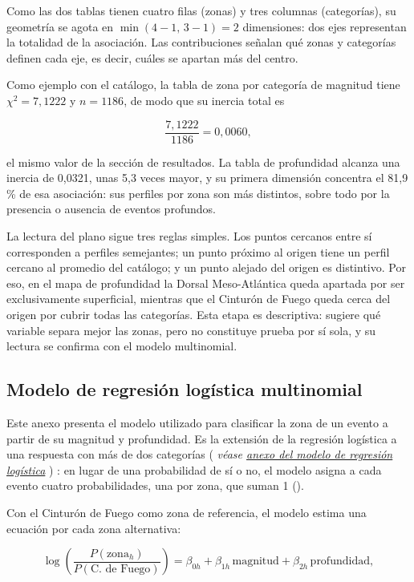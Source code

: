 \documentclass[
  spanish,
  letterpaper,
  DIV=11,
  numbers=noendperiod]{scrartcl}
\newcommand{\asesoriaParenRef}[1]{%
  \textnormal{\textcolor{asesoriaTextColor}{(}}%
  {\hypersetup{linkcolor=asesoriaLinkColor,urlcolor=asesoriaLinkColor,citecolor=asesoriaLinkColor}\textcolor{asesoriaTextColor}{\emph{#1}}}%
  \textnormal{\textcolor{asesoriaTextColor}{)}}%
}
\begin{document}
Como las dos tablas tienen cuatro filas (zonas) y tres columnas
(categorías), su geometría se agota en \(\min(4-1,\,3-1)=2\)
dimensiones: dos ejes representan la totalidad de la asociación. Las
contribuciones señalan qué zonas y categorías definen cada eje, es
decir, cuáles se apartan más del centro.

Como ejemplo con el catálogo, la tabla de zona por categoría de magnitud
tiene \(\chi^2=7{,}1222\) y \(n=1186\), de modo que su inercia total es

\[
\frac{7{,}1222}{1186}=0{,}0060,
\]

el mismo valor de la sección de resultados. La tabla de profundidad
alcanza una inercia de 0,0321, unas 5,3 veces mayor, y su primera
dimensión concentra el 81,9 \% de esa asociación: sus perfiles por zona
son más distintos, sobre todo por la presencia o ausencia de eventos
profundos.

La lectura del plano sigue tres reglas simples. Los puntos cercanos
entre sí corresponden a perfiles semejantes; un punto próximo al origen
tiene un perfil cercano al promedio del catálogo; y un punto alejado del
origen es distintivo. Por eso, en el mapa de profundidad la Dorsal
Meso-Atlántica queda apartada por ser exclusivamente superficial,
mientras que el Cinturón de Fuego queda cerca del origen por cubrir
todas las categorías. Esta etapa es descriptiva: sugiere qué variable
separa mejor las zonas, pero no constituye prueba por sí sola, y su
lectura se confirma con el modelo multinomial.

\subsection{Modelo de regresión logística
multinomial}\label{sec-anexo-multinomial}

Este anexo presenta el modelo utilizado para clasificar la zona de un
evento a partir de su magnitud y profundidad. Es la extensión de la
regresión logística a una respuesta con más de dos categorías
\asesoriaParenRef{véase \hyperref[sec-anexo-logistica]{anexo del modelo de regresión logística}}:
en lugar de una probabilidad de sí o no, el modelo asigna a cada evento
cuatro probabilidades, una por zona, que suman 1
().

Con el Cinturón de Fuego como zona de referencia, el modelo estima una
ecuación por cada zona alternativa:

\[
\log\!\left(\frac{P(\text{zona}_h)}{P(\text{C. de Fuego})}\right)=\beta_{0h}+\beta_{1h}\,\text{magnitud}+\beta_{2h}\,\text{profundidad},
\]
\end{document}
